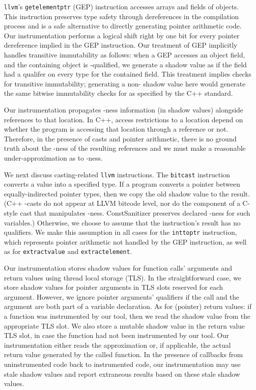 \texttt{llvm}'s \texttt{getelementptr} (GEP) instruction accesses arrays and
fields of objects.
This instruction preserves type safety through dereferences in the compilation
process and is a safe alternative to directly generating pointer arithmetic
code.
Our instrumentation performs a logical shift right by one bit for every pointer
dereference implied in the GEP instruction.
Our treatment of GEP implicitly handles transitive immutability as follows: when
a GEP accesses an object field, and the containing object is \const{}-qualified,
we generate a shadow value as if the field had a \const{} qualifer on every type
for the contained field.
This treatment implies checks for transitive immutability; generating a
non-\const{} shadow value here would generate the same bitwise immutability
checks for \const{} as specified by the C++ standard.

Our instrumentation propagates \const{}-ness information (in
shadow values) alongside references to that location.
In C++, access restrictions to a location depend on whether the
program is accessing that location through a \const{} reference or not.
Therefore, in the presence of casts and pointer arithmetic, there is no ground
truth about the \const{}-ness of the resulting references and we must make a
reasonable under-approximation as to \const{}-ness.

We next discuss casting-related \texttt{llvm} instructions.
The \texttt{bitcast} instruction converts a value into a specified type.
If a program converts a pointer between equally-indirected pointer types, then
we copy the old shadow value to the result.
(C++ \const{}-casts do not appear at LLVM bitcode level, nor
do the component of a C-style cast that manipulates \const{}-ness.
ConstSanitizer preserves declared \const{}-ness for such variables.)
Otherwise, we choose to assume that the instruction's result has no \const{}
qualifiers.
We make this assumption in all cases for the \texttt{inttoptr} instruction,
which represents pointer arithmetic not handled by the GEP instruction, as well
as for \texttt{extractvalue} and \texttt{extractelement}.

Our instrumentation stores shadow values for function calls' arguments and
return values using thread local storage (TLS).
In the straightforward case, we store shadow values for pointer arguments in
TLS slots reserved for each argument.
However, we ignore pointer arguments' \const{} qualifiers if the call and the
argument are both part of a variable declaration.
As for (pointer) return values: if a function was instrumented by our tool, then
we read the shadow value from the appropriate TLS slot.
We also store a mutable shadow value in the return value TLS slot, in case the
function had not been instrumented by our tool.
Our instrumentation either reads the approximation or, if applicable, the actual
return value generated by the called function.
In the presence of callbacks from uninstrumented code back to instrumented code,
our instrumentation may use stale shadow values and report extraneous results
based on these stale shadow values.

